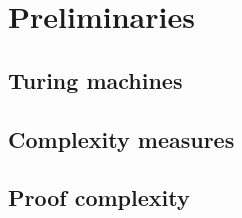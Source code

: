 
\chapter{Preliminaries} \label{chap:preliminaries}

\section{Turing machines}

\section{Complexity measures}

\section{Proof complexity}

\cleardoublepage